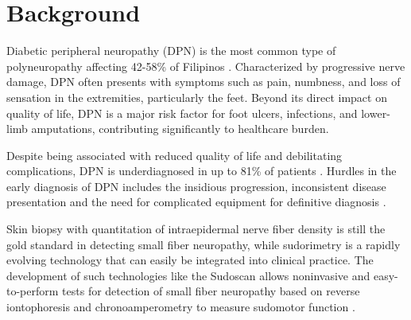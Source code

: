 \documentclass[pdflatex,sn-mathphys-num]{sn-jnl}%
\theoremstyle{thmstyleone}%
\theoremstyle{thmstyletwo}%
\theoremstyle{thmstylethree}%
\begin{document}



\maketitle

\section{Background}
\label{introduction}



Diabetic peripheral neuropathy (DPN) is the most common type of polyneuropathy affecting 42-58\% of Filipinos \cite{ropper2019adams, araneta2006hyperglycemia, dagang2016validation}.
Characterized by progressive nerve damage, DPN often presents with symptoms such as pain, numbness, and loss of sensation in the extremities, particularly the feet. Beyond its direct impact on quality of life, DPN is a major risk factor for foot ulcers, infections, and lower-limb amputations, contributing significantly to healthcare burden.

Despite being associated with reduced quality of life and debilitating complications,
DPN is underdiagnosed in up to 81\% of patients \cite{vinik2012neuropathy, ziegler2018painful}. Hurdles in the early diagnosis of DPN includes the insidious progression, inconsistent disease presentation and the need for complicated equipment for definitive diagnosis \cite{vinik2012neuropathy, ziegler2018painful, casellini2013sudoscan}.

Skin biopsy with quantitation of intraepidermal nerve fiber density is still the gold standard in detecting small fiber neuropathy, while sudorimetry is a rapidly evolving technology that can easily be integrated into clinical practice. The development of such technologies like the Sudoscan allows noninvasive and easy-to-perform tests for detection of small fiber neuropathy based on reverse iontophoresis and chronoamperometry to measure sudomotor function \cite{mayaudon:2010newsimple, vinik2015newage}.
\end{document}
